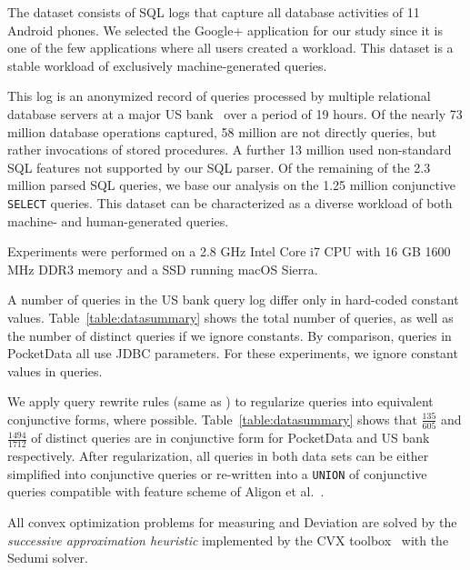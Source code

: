  The dataset consists of SQL logs that capture all database activities of 11 Android phones. 
We selected the Google+ application for our study since it is one of the few applications where all users created a workload. 
This dataset is a stable workload of exclusively machine-generated queries.

This log is an anonymized record of queries processed by multiple relational database servers at a major US bank~\cite{DBLP:conf/www/KulLXCCKU16} over a period of 19 hours.
Of the nearly 73 million database operations captured, 58 million are not directly queries, but rather invocations of stored procedures.
A further 13 million used non-standard SQL features not supported by our SQL parser. 
Of the remaining of the 2.3 million parsed SQL queries, we base our analysis on the 1.25 million conjunctive \texttt{SELECT} queries. 
This dataset can be characterized as a diverse workload of both machine- and human-generated queries.

\label{sec:commonexperimentsettings}
Experiments were performed on a 2.8 GHz Intel Core i7 CPU with 16 GB 1600 MHz DDR3 memory and a SSD running macOS Sierra.

A number of queries in the US bank query log differ only in hard-coded constant values.
Table~\ref{table:datasummary} shows the total number of queries, as well as the number of distinct queries if we ignore constants.
By comparison, queries in PocketData all use JDBC parameters.
For these experiments, we ignore constant values in queries.

We apply query rewrite rules (same as \cite{8352666}) to regularize queries into equivalent conjunctive forms, where possible. 
Table~\ref{table:datasummary} shows that $\frac{135}{605}$ and $\frac{1494}{1712}$ of distinct queries are in conjunctive form for PocketData and US bank respectively. 
After regularization, all queries in both data sets can be either simplified into conjunctive queries or re-written into a \texttt{UNION} of conjunctive queries compatible with feature scheme of Aligon et al.~\cite{DBLP:journals/kais/AligonGMRT14}.

All convex optimization problems for measuring \errorname and Deviation are solved by the \textit{successive approximation heuristic} implemented by the CVX toolbox~\cite{cvx} with the Sedumi solver.

